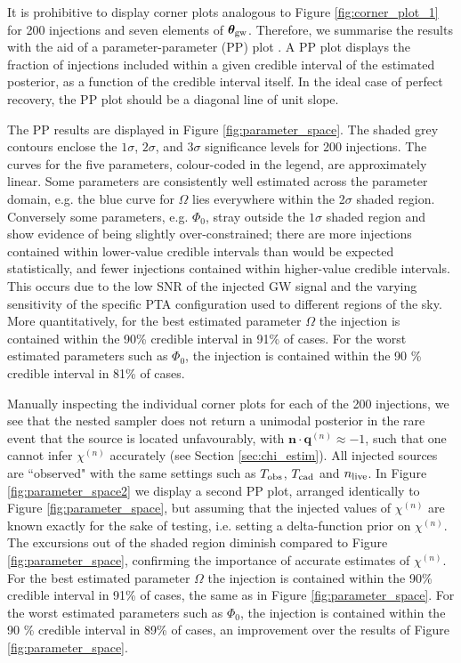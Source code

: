 \documentclass[fleqn,usenatbib,useAMS]{mnras}
\begin{document}
It is prohibitive to display corner plots analogous to Figure \ref{fig:corner_plot_1} for 200 injections and seven elements of $\boldsymbol{\theta}_{\rm gw}$. Therefore, we summarise the results with the aid of a parameter-parameter (PP) plot \citep{doi:10.1198/106186006X136976}. A PP plot displays the fraction of injections included within a given credible interval of the estimated posterior, as a function of the credible interval itself. In the ideal case of perfect recovery, the PP plot should be a diagonal line of unit slope. \newline 
 
The PP results are displayed in Figure \ref{fig:parameter_space}. The shaded grey contours enclose the $1\sigma$, $2\sigma$, and $3\sigma$ significance levels for 200 injections. The curves for the five parameters, colour-coded in the legend, are approximately linear. Some parameters are consistently well estimated across the parameter domain, e.g. the blue curve for $\Omega$ lies everywhere within the 2$\sigma$ shaded region. Conversely some parameters, e.g. $\Phi_0$, stray outside the $1\sigma$ shaded region and show evidence of being slightly over-constrained; there are more injections contained within lower-value credible intervals than would be expected statistically, and fewer injections contained within higher-value credible intervals. This occurs due to the low SNR of the injected GW signal and the varying sensitivity of the specific PTA configuration used to different regions of the sky. More quantitatively, for the best estimated parameter $\Omega$ the injection is contained within the 90\% credible interval in 91\% of cases. For the worst estimated parameters such as $\Phi_0$, the injection is contained within the 90 \% credible interval in 81\% of cases. \newline 

Manually inspecting the individual corner plots for each of the 200 injections, we see that the nested sampler does not return a unimodal posterior in the rare event that the source is located unfavourably, with $\boldsymbol{n} \cdot \boldsymbol{q}^{(n)} \approx -1$, such that one cannot infer $\chi^{(n)}$ accurately (see Section \ref{sec:chi_estim}). All injected sources are ``observed" with the same settings such as $T_{\rm obs}$, $T_{\rm cad}$ and $n_{\rm live}$. In Figure \ref{fig:parameter_space2} we display a second PP plot, arranged identically to Figure \ref{fig:parameter_space}, but assuming that the injected values of $\chi^{(n)}$ are known exactly for the sake of testing, i.e. setting a delta-function prior on $\chi^{(n)}$. The excursions out of the shaded region diminish compared to Figure \ref{fig:parameter_space}, confirming the importance of accurate estimates of $\chi^{(n)}$. For the best estimated parameter $\Omega$ the injection is contained within the 90\% credible interval in 91\% of cases, the same as in Figure \ref{fig:parameter_space}. For the worst estimated parameters such as $\Phi_0$, the injection is contained within the 90 \% credible interval in 89\% of cases, an improvement over the results of Figure \ref{fig:parameter_space}. \newline 
\end{document}
